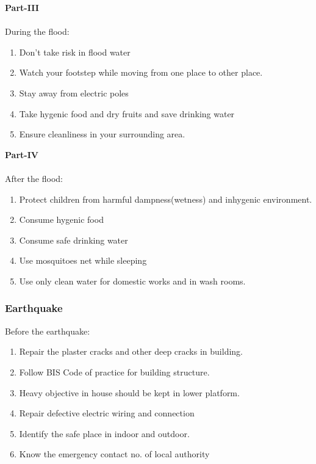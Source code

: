 \documentclass[12pt,a4paper]{article}
\begin{document}
\textbf{Part-III}\\ \\
During the flood: 
\begin{enumerate}
	\item Don't take risk in flood water
	\item Watch your footstep while moving from one place to other place.
	\item Stay away from electric poles
	\item Take hygenic food and dry fruits and save drinking water
	\item Ensure cleanliness in your surrounding area.
\end{enumerate}

\textbf{Part-IV}\\ \\
After the flood: 
\begin{enumerate}
	\item Protect children from harmful dampness(wetness) and inhygenic environment.
	\item Consume hygenic food
	\item Consume safe drinking water
	\item Use mosquitoes net while sleeping
	\item Use only clean water for domestic works and in wash rooms.
\end{enumerate}

\subsubsection*{Earthquake}
Before the earthquake:
\begin{enumerate}
	\item Repair the plaster cracks and other deep cracks in building.
	\item Follow BIS Code of practice for building structure.
	\item Heavy objective in house should be kept in lower platform.
	\item Repair defective electric wiring and connection
	\item Identify the safe place in indoor and outdoor.
	\item Know the emergency contact no. of local authority
\end{enumerate}





  
\end{document}
